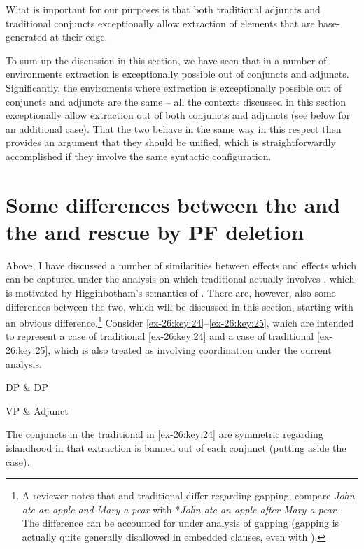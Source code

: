 \documentclass[output=paper]{langsci/langscibook}
\begin{document}
What is important for our purposes is that both traditional adjuncts and
traditional conjuncts exceptionally allow extraction of elements that are
base-ge\-ne\-rat\-ed at their edge.

To sum up the discussion in this section, we have seen that in a number of
environments extraction is exceptionally possible out of conjuncts and
adjuncts. Significantly, the enviroments where extraction is exceptionally
possible out of conjuncts and adjuncts are the same – all the contexts
discussed in this section exceptionally allow extraction out of both conjuncts
and adjuncts (see below for an additional case). That the two behave in the
same way in this respect then provides an argument that they should be unified,
which is straightforwardly accomplished if they involve the same syntactic
configuration.

\section{Some differences between the  and the
 and rescue by PF deletion}

Above, I have discussed a number of similarities between 
effects and  effects which can be captured under the analysis
on which traditional  actually involves , which is
motivated by Higginbotham’s semantics of . There are, however, also
some differences between the two, which will be discussed in this section,
starting with an obvious difference.\footnote{A reviewer notes that
     and traditional  differ regarding gapping, compare
    \emph{John ate an apple and Mary a pear} with *\emph{John ate an apple
    after Mary a pear}. The difference can be accounted for under  analysis of gapping (gapping is actually quite generally disallowed
in embedded clauses, even with ).} Consider \eqref{ex-26:key:24}--\eqref{ex-26:key:25}, which are
intended to represent a case of traditional  \eqref{ex-26:key:24} and a case of
traditional  \eqref{ex-26:key:25}, which is also treated as involving coordination
under the current analysis.

\ea\label{ex-26:key:24} DP \& DP
\z

\ea\label{ex-26:key:25} VP \& Adjunct
\z

The conjuncts in the traditional  in \eqref{ex-26:key:24} are symmetric regarding
islandhood in that extraction is banned out of each conjunct (putting aside the
 case).
\end{document}
